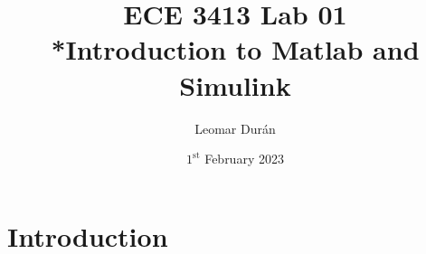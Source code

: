 \documentclass{article}
\title{ECE 3413 Lab 01\\*Introduction to Matlab and Simulink}
\author{Leomar Dur\'an}
\date{$1^{\text{st}}$ February 2023}
\begin{document}
\maketitle

\section{Introduction}
\end{document}
